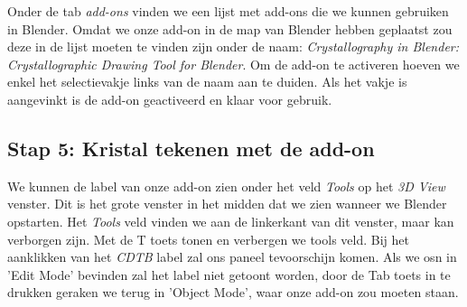 Onder de tab \textit{add-ons} vinden we een lijst met add-ons die we kunnen gebruiken in Blender. Omdat we onze add-on in de map van Blender hebben geplaatst zou deze in de lijst moeten te vinden zijn onder de naam: \textit{Crystallography in Blender: Crystallographic Drawing Tool for Blender}. Om de add-on te activeren hoeven we enkel het selectievakje links van de naam aan te duiden. Als het vakje is aangevinkt is de add-on geactiveerd en klaar voor gebruik.

\subsection{Stap 5: Kristal tekenen met de add-on}
We kunnen de label van onze add-on zien onder het veld \textit{Tools} op het \textit{3D View} venster. Dit is het grote venster in het midden dat we zien wanneer we Blender opstarten. Het \textit{Tools} veld vinden we aan de linkerkant van dit venster, maar kan verborgen zijn. Met de T toets tonen en verbergen we tools veld. Bij het aanklikken van het \textit{CDTB} label zal ons paneel tevoorschijn komen. Als we osn in 'Edit Mode' bevinden zal het label niet getoont worden, door de Tab toets in te drukken geraken we terug in 'Object Mode', waar onze add-on zou moeten staan.  
\par   



